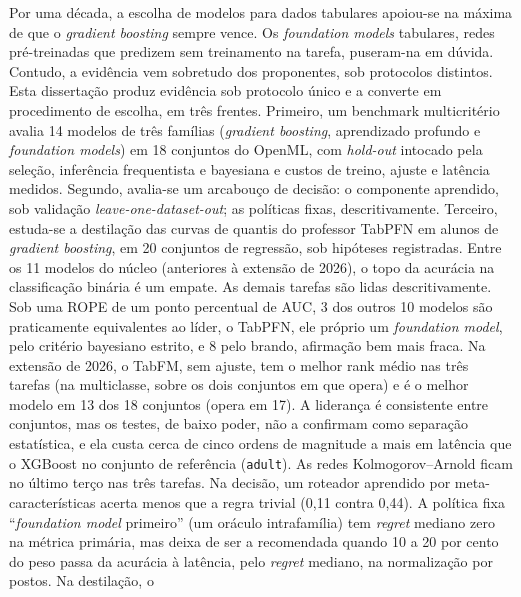 \enlargethispage{2\baselineskip}%
Por uma década, a escolha de modelos para dados tabulares apoiou-se na
máxima de que o \emph{gradient boosting} sempre vence. Os
\emph{foundation models} tabulares, redes pré-treinadas que predizem sem
treinamento na tarefa, puseram-na em dúvida. Contudo, a evidência vem sobretudo dos proponentes, sob protocolos
distintos. Esta dissertação produz evidência sob protocolo único e a
converte em procedimento de escolha, em três frentes. Primeiro, um
benchmark multicritério avalia 14 modelos de três famílias
(\emph{gradient boosting}, aprendizado profundo e \emph{foundation
models}) em 18 conjuntos do OpenML, com \emph{hold-out} intocado pela
seleção, inferência frequentista e bayesiana e custos de treino, ajuste e
latência medidos. Segundo, avalia-se um arcabouço de decisão: o componente
aprendido, sob validação \emph{leave-one-dataset-out}; as políticas fixas,
descritivamente. Terceiro, estuda-se a destilação das curvas de quantis do
professor TabPFN em alunos de \emph{gradient boosting}, em 20 conjuntos de
regressão, sob hipóteses registradas. Entre os 11 modelos do núcleo
(anteriores à extensão de 2026), o topo da acurácia na
classificação binária é um empate. As demais tarefas são lidas
descritivamente. Sob uma ROPE de um ponto percentual de AUC, 3 dos outros
10 modelos são praticamente equivalentes ao líder, o TabPFN, ele próprio um \emph{foundation model}, pelo critério bayesiano estrito, e 8 pelo brando, afirmação bem mais fraca. Na extensão de 2026, o TabFM, sem ajuste, tem o melhor
rank médio nas três tarefas (na multiclasse, sobre os dois conjuntos em que
opera) e é o melhor modelo em 13 dos 18 conjuntos (opera em 17). A
liderança é consistente entre conjuntos, mas os testes, de baixo poder, não
a confirmam como separação estatística, e ela custa cerca de cinco ordens de magnitude a mais em latência que o XGBoost no conjunto de referência (\texttt{adult}). As
redes Kolmogorov--Arnold ficam no último terço nas três tarefas. Na
decisão, um roteador aprendido por meta-características acerta menos que a
regra trivial (0,11 contra 0,44). A política fixa ``\emph{foundation
model} primeiro'' (um oráculo intrafamília) tem \emph{regret} mediano zero
na métrica primária, mas deixa de ser a recomendada quando 10 a 20
por cento do peso passa da acurácia à latência, pelo \emph{regret} mediano, na normalização por postos. Na destilação, o
